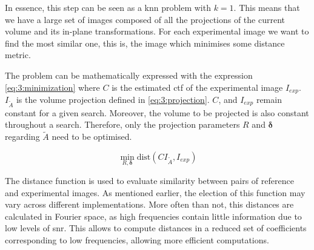 \documentclass[../main.tex]{subfiles}
\begin{document}
In essence, this step can be seen as a \gls{knn}\cite{sorzano2021} problem with $k=1$. This means that we have a large set of images composed of all the projections of the current volume and its in-plane transformations. For each experimental image we want to find the most similar one, this is, the image which minimises some distance metric.

The problem can be mathematically expressed with the expression \eqref{eq:3:minimization} where $C$ is the estimated \gls{ctf} of the experimental image $I_{exp}$. $I_{\tilde{A}}$ is the volume projection defined in \eqref{eq:3:projection}. $C$, and $I_{exp}$ remain constant for a given search. Moreover, the volume to be projected is also constant throughout a search. Therefore, only the projection parameters $R$ and $\bm{\delta}$ regarding $\tilde{A}$ need to be optimised.

\begin{equation}\label{eq:3:minimization}
    \min_{R, \bm{\delta}} \text{dist}(C I_{\tilde{A}} , I_{exp})
\end{equation}

The distance function is used to evaluate similarity between pairs of reference and experimental images. As mentioned earlier, the election of this function may vary across different implementations. More often than not, this distances are calculated in Fourier space, as high frequencies contain little information due to low levels of \gls{snr}. This allows to compute distances in a reduced set of coefficients corresponding to low frequencies, allowing more efficient computations.
\end{document}
